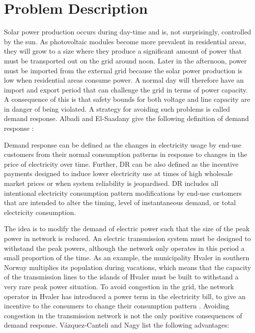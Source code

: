 \documentclass[class=book, crop=false, 11pt]{standalone}
\begin{document}
\chapter{Problem Description}\label{chap:problem_description}
Solar power production occurs during day-time and is, not surprisingly, controlled by the sun. As photovoltaic modules become more prevalent in residential areas, they will grow to a size where they produce a significant amount of power that must be transported out on the grid around noon. Later in the afternoon, power must be imported from the external grid because the solar power production is low when residential areas consume power. A normal day will therefore have an import and export period that can challenge the grid in terms of power capacity. A consequence of this is that safety bounds for both voltage and line capacity are in danger of being violated. A strategy for avoiding such problems is called demand response. Albadi and El-Saadany give the following definition of demand response \cite{demand_response_definition}:

\begin{displayquote}
Demand response can be defined as the changes in electricity usage by end-use customers from their normal consumption patterns in response to changes in the price of electricity over time. Further, DR can be also defined as the incentive payments designed to induce lower electricity use at times of high wholesale market prices or when system reliability is jeopardised. DR includes all intentional electricity consumption pattern modifications by end-use customers that are intended to alter the timing, level of
instantaneous demand, or total electricity consumption.
\end{displayquote}

The idea is to modify the demand of electric power such that the size of the peak power in network is reduced. An electric transmission system must be designed to withstand the peak powers, although the network only operates in this period a small proportion of the time. As an example, the municipality Hvaler in southern Norway multiplies its population during vacations, which means that the capacity of the transmission lines to the islands of Hvaler must be built to withstand a very rare peak power situation. To avoid congestion in the grid, the network operator in Hvaler has introduced a power term in the electricity bill, to give an incentive to the consumers to change their consumption pattern \cite{hvaler}. Avoiding congestion in the transmission network is not the only positive consequences of demand response. Vázquez-Canteli and Nagy list the following advantages\cite{vazquez2019reinforcement}:
\end{document}

